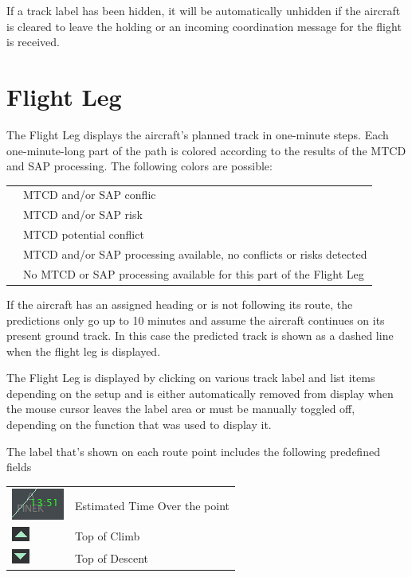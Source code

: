 \documentclass[11pt,a4paper]{memoir}
\newcommand{\colorref}[1]{\textit{\hyperref[#1]{\StrDel{#1}{color:}}}}
\begin{document}
If a track label has been hidden, it will be automatically unhidden if the aircraft is cleared to leave the holding or an incoming coordination message for the flight is received.

\section{Flight Leg}
The Flight Leg displays the aircraft’s planned track in one-minute steps. Each one-minute-long part of the
path is colored according to the results of the MTCD and SAP processing. The following colors are possible:
\medskip

\begin{tabular}{l l}
\colorref{color:Urgency FL}      & MTCD and/or SAP conflic\\
\colorref{color:Warning FL}      & MTCD and/or SAP risk\\
\colorref{color:Potential FL}    & MTCD potential conflict\\
\colorref{color:Information FL}  & MTCD and/or SAP processing available, no conflicts or risks detected\\
\colorref{color:Flight Leg}      & No MTCD or SAP processing available for this part of the Flight Leg\\
\end{tabular}
\medskip

If the aircraft has an assigned heading or is not following its route, the predictions only go up to 10 minutes
and assume the aircraft continues on its present ground track. In this case the predicted track is shown as a
dashed line when the flight leg is displayed.

The Flight Leg is displayed by clicking on various track label and list items depending on the setup and is
either automatically removed from display when the mouse cursor leaves the label area or must be
manually toggled off, depending on the function that was used to display it.

The label that’s shown on each route point includes the following predefined fields

\begin{tabular}{l l}
\includegraphics{img/fleto.png}     & Estimated Time Over the point\\
\includegraphics{img/fltoc.png}   & Top of Climb\\
\includegraphics{img/fltod.png}   & Top of Descent\\
\end{tabular}
\end{document}
